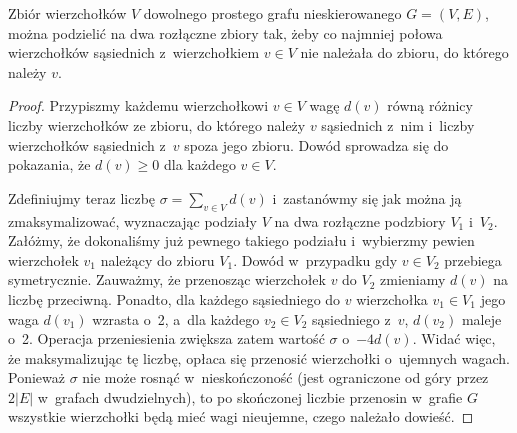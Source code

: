 \subproblem %
\begin{twierdzenie}
	Zbiór wierzchołków $V$ dowolnego prostego grafu nieskierowanego $G=(V,E)$, można podzielić na dwa rozłączne zbiory tak, żeby co najmniej połowa wierzchołków sąsiednich z~wierzchołkiem $v\in V$ nie należała do zbioru, do którego należy $v$.
\end{twierdzenie}
\begin{proof}
Przypiszmy każdemu wierzchołkowi $v\in V$ wagę $d(v)$ równą różnicy liczby wierzchołków ze zbioru, do którego należy $v$ sąsiednich z~nim i~liczby wierzchołków sąsiednich z~$v$ spoza jego zbioru. Dowód sprowadza się do pokazania, że $d(v)\ge0$ dla każdego $v\in V$\!.

Zdefiniujmy teraz liczbę $\sigma=\sum_{v\in V}d(v)$ i~zastanówmy się jak można ją zmaksymalizować, wyznaczając podziały $V$ na dwa rozłączne podzbiory $V_1$ i~$V_2$. Załóżmy, że dokonaliśmy już pewnego takiego podziału i~wybierzmy pewien wierzchołek $v_1$ należący do zbioru $V_1$. Dowód w~przypadku gdy $v\in V_2$ przebiega symetrycznie. Zauważmy, że przenosząc wierzchołek $v$ do $V_2$ zmieniamy $d(v)$ na liczbę przeciwną. Ponadto, dla każdego sąsiedniego do $v$ wierzchołka $v_1\in V_1$ jego waga $d(v_1)$ wzrasta o~2, a~dla każdego $v_2\in V_2$ sąsiedniego z~$v$, $d(v_2)$ maleje o~2. Operacja przeniesienia zwiększa zatem wartość $\sigma$ o~$-4d(v)$. Widać więc, że maksymalizując tę liczbę, opłaca się przenosić wierzchołki o~ujemnych wagach. Ponieważ $\sigma$ nie może rosnąć w~nieskończoność (jest ograniczone od góry przez $2|E|$ w~grafach dwudzielnych), to po skończonej liczbie przenosin w~grafie $G$ wszystkie wierzchołki będą mieć wagi nieujemne, czego należało dowieść.
\end{proof}

